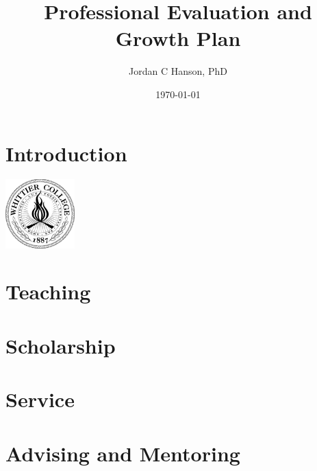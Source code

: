 \documentclass[11pt]{book}
\title{Professional Evaluation and Growth Plan}
\author{Jordan C Hanson, PhD}
\date{\today}
\begin{document}
\maketitle
\tableofcontents

\chapter{Introduction}
\centering
\includegraphics[width=0.2\textwidth]{figures/WhittierCollegeSeal.png}
\begin{flushleft}

\end{flushleft}

\chapter{Teaching}
\begin{flushleft}

\end{flushleft}

\chapter{Scholarship}
\begin{flushleft}

\end{flushleft}

\chapter{Service}
\begin{flushleft}

\end{flushleft}

\chapter{Advising and Mentoring}
\begin{flushleft}

\end{flushleft}



 
\end{document}
